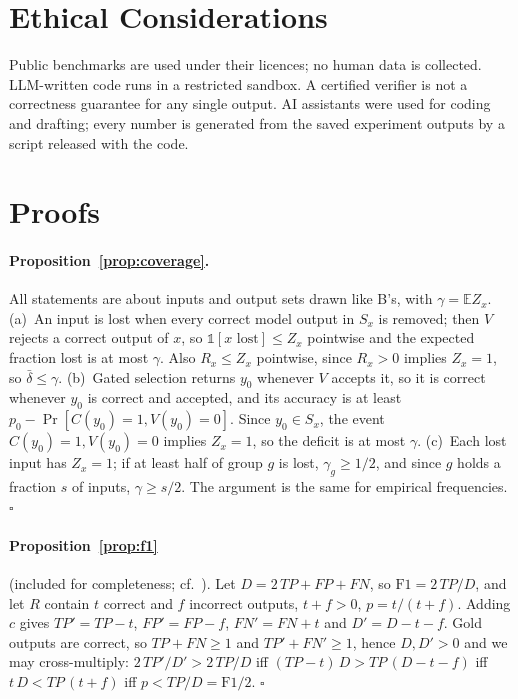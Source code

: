 \documentclass[11pt]{article}
\begin{document}
\section*{Ethical Considerations}
Public benchmarks are used under their licences; no human data is
collected. LLM-written code runs in a restricted sandbox. A certified
verifier is not a correctness guarantee for any single output. AI assistants
were used for coding and drafting; every number is generated from the saved
experiment outputs by a script released with the code.



\appendix
\section{Proofs}\label{app:proofs}
\paragraph{Proposition~\ref{prop:coverage}.} All statements are about
inputs and output sets drawn like B's, with $\gamma=\mathbb{E}Z_x$.
(a)~An input is lost when every correct model output in $S_x$ is removed;
then $V$ rejects a correct output of $x$, so $\mathbb{1}[x\text{ lost}]\le
Z_x$ pointwise and the expected fraction lost is at most $\gamma$. Also
$R_x\le Z_x$ pointwise, since $R_x>0$ implies $Z_x=1$, so
$\bar\delta\le\gamma$. (b)~Gated selection returns $y_0$ whenever $V$
accepts it, so it is correct whenever $y_0$ is correct and accepted, and
its accuracy is at least $p_0-\Pr[C(y_0)=1,V(y_0)=0]$. Since $y_0\in S_x$,
the event $C(y_0)=1,V(y_0)=0$ implies $Z_x=1$, so the deficit is at most
$\gamma$. (c)~Each lost input has $Z_x=1$; if at least half of group $g$
is lost, $\gamma_g\ge1/2$, and since $g$ holds a fraction $s$ of inputs,
$\gamma\ge s/2$. The argument is the same for empirical frequencies.
\hfill$\square$

\paragraph{Proposition~\ref{prop:f1}} (included for completeness;
cf.\ \citealp{zhao2013beyond}). Let $D=2\,TP+FP+FN$, so
$\mathrm{F1}=2\,TP/D$, and let $R$ contain $t$ correct and $f$ incorrect
outputs, $t+f>0$, $p=t/(t+f)$. Adding $c$ gives $TP'=TP-t$, $FP'=FP-f$,
$FN'=FN+t$ and $D'=D-t-f$. Gold outputs are correct, so $TP+FN\ge1$ and
$TP'+FN'\ge1$, hence $D,D'>0$ and we may cross-multiply:
$2\,TP'/D'>2\,TP/D$ iff
$(TP-t)\,D>TP\,(D-t-f)$ iff $t\,D<TP\,(t+f)$ iff $p<TP/D=\mathrm{F1}/2$.
\hfill$\square$
\end{document}
